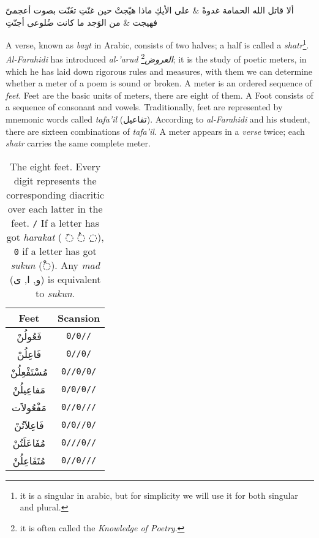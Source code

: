 \documentclass[12pt]{report}
\begin{document}
\vspace{0.5cm}
\begin{Arabic}
  \begin{traditionalpoem*}

    ألا قاتل الله الحمامة غدوةً \quad & \quad على الأيكِ ماذا هيّجتْ حين غنّتِ
    تغَنّت بصوت أعجمىّ فهيجت  \quad & \quad من الوَجد ما كانت ضُلوعى أجنّتِ
  \end{traditionalpoem*}
\end{Arabic}%
\vspace{0.5cm}

A verse, known as \textit{bayt} in Arabic, consists of two halves; a half is
called a \textit{shatr}\footnote{it is a singular in arabic, but for simplicity
we will use it for both singular and plural.}. %
\textit{Al-Farahidi} has introduced \textit{al-'arud
\textarabic{العروض}}\footnote{it is often called the \textit{Knowledge of
Poetry}.}; it is the study of poetic meters, in which he has laid down rigorous
rules and measures, with them we can determine whether a meter of a poem is sound
or broken. A meter is an ordered sequence of \textit{feet}. Feet are the basic
units of meters, there are eight of them. A Foot consists of a sequence of
consonant and vowels. Traditionally, feet are represented by mnemonic words
called \textit{tafa'il} (\textarabic{تفاعيل}).  According to \textit{al-Farahidi}
and his student, there are sixteen combinations of \textit{tafa'il}. A meter
appears in a \textit{verse} twice; each \textit{shatr} carries the same complete
meter.%

\begin{table}[!t]
  \centering
  \begin{tabular}{|c|c|} 
    \hline
    \textbf{Feet} & \textbf{Scansion} \\ 
    \hline
    \textarabic{فَعُولُنْ}  & \texttt{0/0//}\\
    \textarabic{فَاعِلُنْ}  & \texttt{0//0/}\\
    \textarabic{مُسْتَفْعِلُنْ}& \texttt{0//0/0/}\\
    \textarabic{مَفاعِيلُنْ}& \texttt{0/0/0//}\\
    \textarabic{مَفْعُولاَت} & \texttt{0//0///}\\
    \textarabic{فَاعِلاَتُنْ} & \texttt{0/0//0/}\\
    \textarabic{مُفَاعَلَتُنْ}& \texttt{0///0//}\\
    \textarabic{مُتَفَاعِلُنْ}& \texttt{0//0///}\\
    \hline
  \end{tabular}
  \caption{The eight feet. Every digit represents the corresponding diacritic
over each latter in the feet. \texttt{/} If a letter has got \textit{harakat} (
\textarabic{◌َ} \textarabic{◌ُ} \textarabic{◌ِ}), \texttt{0} if a letter has got
\textit{sukun} (\textarabic{◌ْ}). Any \textit{mad} (\textarabic{و, ا, ى}) is
equivalent to \textit{sukun}.}\label{arud:feet}
\end{table}
\end{document}
